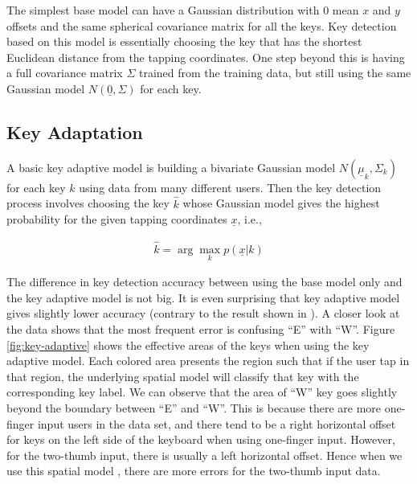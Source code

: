 \documentclass{sigchi}
\begin{document}
The simplest base model can have a Gaussian distribution with 0 mean $x$ and $y$
 offsets and the same spherical covariance matrix for all the keys. Key
detection based on this model is essentially choosing the key that has the shortest Euclidean distance from the tapping coordinates. 
One step beyond this is having a full covariance matrix $\Sigma$ trained from the
training data, but still using the same Gaussian model $N(\underline 0, \Sigma)$ for each key.

\subsection{Key Adaptation}
A basic key adaptive model is building a bivariate Gaussian model
$N(\underline\mu_k, \Sigma_k)$ for each key $k$ using data from many different
users.
Then the key detection process involves choosing the key $\hat k$ whose Gaussian
model gives the highest probability for the given tapping coordinates
$\underline x$, i.e.,

\begin{align}
\hat k = \arg\max_k p(\underline x|k)
\end{align}

The difference in key detection accuracy between using the base model only and
the key adaptive model is not big. It is even surprising that key adaptive model
gives slightly lower accuracy (contrary to the result shown in
\cite{Rudchenko:2011}). A closer look at the data shows that the most frequent
error is confusing ``E'' with ``W''. Figure \ref{fig:key-adaptive} shows the effective areas of the keys
when using the key adaptive model. Each colored area presents the region such that if the
user tap in that region, the underlying spatial model will classify that key with the 
corresponding key label. We can observe that the area of ``W'' key goes slightly beyond 
the boundary between ``E'' and ``W''. This is because there are more one-finger input users in the data set, 
and there tend to be a right horizontal offset for keys on the left side of the keyboard
when using one-finger input. However, for
the two-thumb input, there is usually a left horizontal offset. Hence when we use
this spatial model , there are more errors for the two-thumb input data.
\end{document}
